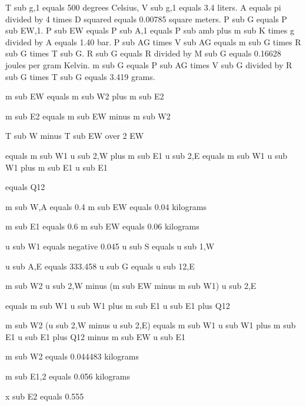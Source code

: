 T sub g,1 equals 500 degrees Celsius, V sub g,1 equals 3.4 liters.  
A equals pi divided by 4 times D squared equals 0.00785 square meters.  
P sub G equals P sub EW,1.  
P sub EW equals P sub A,1 equals P sub amb plus m sub K times g divided by A equals 1.40 bar.  
P sub AG times V sub AG equals m sub G times R sub G times T sub G.  
R sub G equals R divided by M sub G equals 0.16628 joules per gram Kelvin.  
m sub G equals P sub AG times V sub G divided by R sub G times T sub G equals 3.419 grams.

m sub EW equals m sub W2 plus m sub E2

m sub E2 equals m sub EW minus m sub W2

T sub W minus T sub EW over 2 EW

equals m sub W1 u sub 2,W plus m sub E1 u sub 2,E equals m sub W1 u sub W1 plus m sub E1 u sub E1

equals Q12

m sub W,A equals 0.4 m sub EW equals 0.04 kilograms

m sub E1 equals 0.6 m sub EW equals 0.06 kilograms

u sub W1 equals negative 0.045 u sub S equals u sub 1,W

u sub A,E equals 333.458 u sub G equals u sub 12,E

m sub W2 u sub 2,W minus (m sub EW minus m sub W1) u sub 2,E

equals m sub W1 u sub W1 plus m sub E1 u sub E1 plus Q12

m sub W2 (u sub 2,W minus u sub 2,E) equals m sub W1 u sub W1 plus m sub E1 u sub E1 plus Q12 minus m sub EW u sub E1

m sub W2 equals 0.044483 kilograms

m sub E1,2 equals 0.056 kilograms

x sub E2 equals 0.555